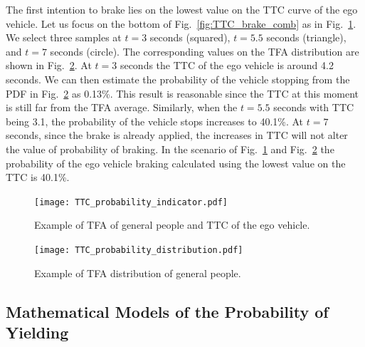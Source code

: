 The first intention to brake lies on the lowest value on the TTC curve of the ego vehicle. Let us focus on the bottom of Fig.~\ref{fig:TTC_brake_comb} as in Fig.~\ref{fig:TTC_TFA_indicator}. We select three samples at $t=3$ seconds (squared), $t=5.5$ seconds (triangle), and $t=7$ seconds (circle). The corresponding values on the TFA distribution are shown in Fig.~\ref{fig:TTC_distribution}. At $t=3$ seconds the TTC of the ego vehicle is around 4.2 seconds. We can then estimate the probability of the vehicle stopping from the PDF in Fig.~\ref{fig:TTC_distribution} as 0.13\%. This result is reasonable since the TTC at this moment is still far from the TFA average. Similarly, when the $t=5.5$ seconds with TTC being 3.1, the probability of the vehicle stops increases to 40.1\%. At $t=7$ seconds, since the brake is already applied, the increases in TTC will not alter the value of probability of braking. In the scenario of Fig.~\ref{fig:TTC_TFA_indicator} and Fig.~\ref{fig:TTC_distribution} the probability of the ego vehicle braking calculated using the lowest value on the TTC is 40.1\%.

\begin{figure}[htbp!]
\begin{center}
\texttt{[image: TTC\_probability\_indicator.pdf]}
\end{center}
\caption{Example of TFA of general people and TTC of the ego vehicle.}
\label{fig:TTC_TFA_indicator} 
\end{figure}

\begin{figure}[htbp!]
\begin{center}
\texttt{[image: TTC\_probability\_distribution.pdf]}
\end{center}
\caption{Example of TFA distribution of general people.}
\label{fig:TTC_distribution} 
\end{figure}
 
\newpage

\subsection{Mathematical Models of the Probability of Yielding}
\label{subsec:MathModel}


